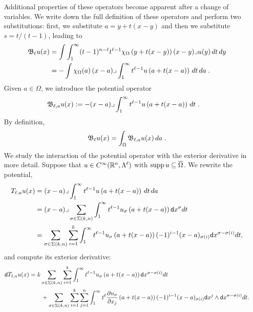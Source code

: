 \documentclass[a4paper]{article}
\begin{document}
Additional properties of these operators become apparent after a change of variables. 
We write down the full definition of these operators and perform two substitutions:
first, we substitute $a = y + t(x-y)$ and then we substitute $s = t/(t-1)$,
leading to 
\begin{align*}
    {\mathfrak B}_{\ell} u(x) 
    &= 
    \int \int_{1}^\infty (t-1)^{n-\ell}t^{\ell-1} 
    \chi_{\Omega}\left(y+t(x-y)\right) 
    (x-y)\lrcorner u(y) \,dt\,dy 
    \\
    &=
    - \int \chi_{\Omega}(a) \,(x-a)\lrcorner \int_{1}^\infty t^{\ell-1} u\left(a+t(x-a)\right)\,dt\,da\;
    .
\end{align*}
% 
Given $a \in \Omega$, we introduce the potential operator 
\begin{align*}
    {\mathfrak B}_{\ell,a} u(x) 
    &:= 
    - (x-a)\lrcorner \int_{1}^\infty t^{\ell-1} u\left(a+t(x-a)\right)\,dt\;
    .
\end{align*}
By definition,
\begin{align*}
    {\mathfrak B}_{\ell} u(x) 
    =
    \int_{\Omega} {\mathfrak B}_{\ell,a} u(x) \,da\;
    .
\end{align*}
We study the interaction of the potential operator with the exterior derivative in more detail.
Suppose that $u \in C^{\infty}({\mathbb R}^n,\Lambda^{\ell})$ with $\operatorname{supp} u \subseteq \overline\Omega$.
We rewrite the potential,
\begin{align*}
    T_{\ell,a} u(x) 
    &= 
    (x-a)\lrcorner \int_{1}^\infty t^{\ell-1} u\left(a+t(x-a)\right)\,dt\,da\;
    \\&
    = 
    (x-a)\lrcorner 
    \sum_{\sigma \in \Sigma(k,n)}
    \int_{1}^\infty 
    t^{\ell-1} u_{\sigma}\left(a+t(x-a)\right) {\mathsf d}x^{\sigma} dt 
    \\&
    = 
    \sum_{\sigma \in \Sigma(k,n)} \sum_{i=1}^{k}
    \int_{1}^\infty 
    t^{\ell-1} u_{\sigma}\left(a+t(x-a)\right) (-1)^{i-1} (x-a)_{\sigma(i) } {\mathsf d}x^{\sigma-\sigma(i)} dt 
    ,
\end{align*}
and compute its exterior derivative:
\begin{align*}
    {\mathsf d} T_{\ell,a} u(x) 
    &= 
    k
    \sum_{\sigma \in \Sigma(k,n)} \sum_{i=1}^{k}
    \int_{1}^\infty 
    t^{\ell-1} u_{\sigma}\left(a+t(x-a)\right) {\mathsf d}x^{\sigma-\sigma(i)} dt 
    \\&\qquad
    + 
    \sum_{\sigma \in \Sigma(k,n)} \sum_{i=1}^{k} \sum_{j=1}^{n}
    \int_{1}^\infty 
    t^{\ell} \frac{ \partial u_{\sigma} }{\partial x_{j}}\left(a+t(x-a)\right) (-1)^{i-1} (x-a)_{\sigma(i) } {\mathsf d}x^{j} \wedge {\mathsf d}x^{\sigma-\sigma(i)} dt 
    .
\end{align*}
\end{document}
